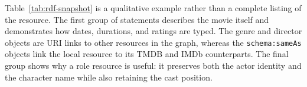 Table~\ref{tab:rdf-snapshot} is a qualitative example rather than a complete
listing of the resource. The first group of statements describes the movie
itself and demonstrates how dates, durations, and ratings are typed. The
genre and director objects are URI links to other resources in the graph,
whereas the \texttt{schema:sameAs} objects link the local resource to its
TMDB and IMDb counterparts. The final group shows why a role resource is
useful: it preserves both the actor identity and the character name while
also retaining the cast position.